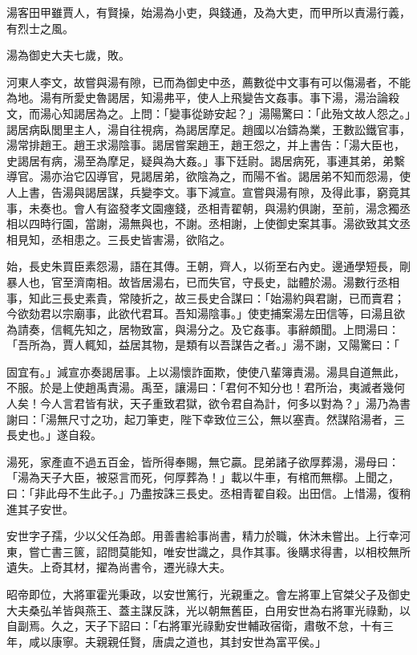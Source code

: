 \begin{pinyinscope}
湯客田甲雖賈人，有賢操，始湯為小吏，與錢通，及為大吏，而甲所以責湯行義，有烈士之風。

湯為御史大夫七歲，敗。

河東人李文，故嘗與湯有隙，已而為御史中丞，薦數從中文事有可以傷湯者，不能為地。湯有所愛史魯謁居，知湯弗平，使人上飛變告文姦事。事下湯，湯治論殺文，而湯心知謁居為之。上問：「變事從跡安起？」湯陽驚曰：「此殆文故人怨之。」謁居病臥閭里主人，湯自往視病，為謁居摩足。趙國以冶鑄為業，王數訟鐵官事，湯常排趙王。趙王求湯陰事。謁居嘗案趙王，趙王怨之，并上書告：「湯大臣也，史謁居有病，湯至為摩足，疑與為大姦。」事下廷尉。謁居病死，事連其弟，弟繫導官。湯亦治它囚導官，見謁居弟，欲陰為之，而陽不省。謁居弟不知而怨湯，使人上書，告湯與謁居謀，兵變李文。事下減宣。宣嘗與湯有隙，及得此事，窮竟其事，未奏也。會人有盜發孝文園瘞錢，丞相青翟朝，與湯約俱謝，至前，湯念獨丞相以四時行園，當謝，湯無與也，不謝。丞相謝，上使御史案其事。湯欲致其文丞相見知，丞相患之。三長史皆害湯，欲陷之。

始，長史朱買臣素怨湯，語在其傳。王朝，齊人，以術至右內史。邊通學短長，剛暴人也，官至濟南相。故皆居湯右，已而失官，守長史，詘體於湯。湯數行丞相事，知此三長史素貴，常陵折之，故三長史合謀曰：「始湯約與君謝，已而賣君；今欲劾君以宗廟事，此欲代君耳。吾知湯陰事。」使吏捕案湯左田信等，曰湯且欲為請奏，信輒先知之，居物致富，與湯分之。及它姦事。事辭頗聞。上問湯曰：「吾所為，賈人輒知，益居其物，是類有以吾謀告之者。」湯不謝，又陽驚曰：「

固宜有。」減宣亦奏謁居事。上以湯懷詐面欺，使使八輩簿責湯。湯具自道無此，不服。於是上使趙禹責湯。禹至，讓湯曰：「君何不知分也！君所治，夷滅者幾何人矣！今人言君皆有狀，天子重致君獄，欲令君自為計，何多以對為？」湯乃為書謝曰：「湯無尺寸之功，起刀筆吏，陛下幸致位三公，無以塞責。然謀陷湯者，三長史也。」遂自殺。

湯死，家產直不過五百金，皆所得奉賜，無它贏。昆弟諸子欲厚葬湯，湯母曰：「湯為天子大臣，被惡言而死，何厚葬為！」載以牛車，有棺而無槨。上聞之，曰：「非此母不生此子。」乃盡按誅三長史。丞相青翟自殺。出田信。上惜湯，復稍進其子安世。

安世字子孺，少以父任為郎。用善書給事尚書，精力於職，休沐未嘗出。上行幸河東，嘗亡書三篋，詔問莫能知，唯安世識之，具作其事。後購求得書，以相校無所遺失。上奇其材，擢為尚書令，遷光祿大夫。

昭帝即位，大將軍霍光秉政，以安世篤行，光親重之。會左將軍上官桀父子及御史大夫桑弘羊皆與燕王、蓋主謀反誅，光以朝無舊臣，白用安世為右將軍光祿勳，以自副焉。久之，天子下詔曰：「右將軍光祿勳安世輔政宿衛，肅敬不怠，十有三年，咸以康寧。夫親親任賢，唐虞之道也，其封安世為富平侯。」


\end{pinyinscope}
